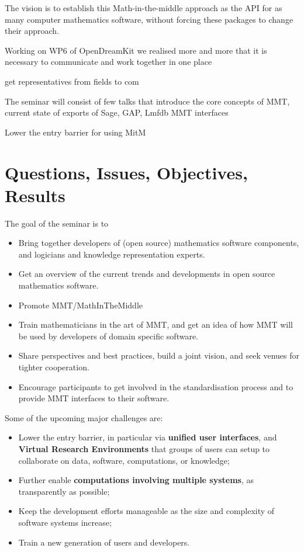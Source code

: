 The vision is to establish this Math-in-the-middle approach as the API for as
many computer mathematics software, without forcing these packages to change
their approach.

Working on WP6 of OpenDreamKit we realised more and more that it is necessary to
communicate and work together in one place

get representatives from fields to com

The seminar will consist of few talks that introduce the core concepts of MMT,
current state of exports of Sage, GAP, Lmfdb MMT interfaces

Lower the entry barrier for using MitM

\section{Questions, Issues, Objectives, Results}



The goal of the seminar is to 
\begin{itemize}
\item Bring together developers of (open source) mathematics software
  components, and logicians and knowledge representation experts.
\item Get an overview of the current trends and developments in open source
  mathematics software.
\item Promote MMT/MathInTheMiddle
\item Train mathematicians in the art of MMT, and get an idea of how MMT will be
  used by developers of domain specific software.
\item Share perspectives and best practices, build a joint vision, and
  seek venues for tighter cooperation.
\item Encourage participants to get involved in the standardisation process and
  to provide MMT interfaces to their software.
\end{itemize}

Some of the upcoming major challenges are:
\begin{itemize}
\item Lower the entry barrier, in particular via \textbf{unified user
    interfaces}, and \textbf{Virtual Research Environments} that
  groups of users can setup to collaborate on data, software,
  computations, or knowledge;
\item Further enable \textbf{computations involving multiple systems},
  as transparently as possible;
\item Keep the development efforts manageable as the size and
  complexity of software systems increase;
\item Train a new generation of users and developers.
\end{itemize}

